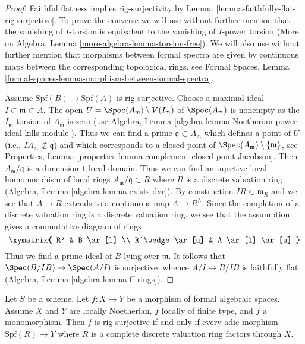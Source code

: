 \begin{proof}
Faithful flatness implies rig-surjectivity by
Lemma \ref{lemma-faithfully-flat-rig-surjective}.
To prove the converse we will use without further mention that the
vanishing of $I$-torsion is equivalent to the vanishing of $I$-power torsion
(More on Algebra, Lemma \ref{more-algebra-lemma-torsion-free}).
We will also use without further mention that morphisms between
formal spectra are given by continuous maps between the corresponding
topological rings, see
Formal Spaces, Lemma \ref{formal-spaces-lemma-morphism-between-formal-spectra}.

\medskip\noindent
Assume $\text{Spf}(B) \to \text{Spf}(A)$ is rig-surjective.
Choose a maximal ideal $I \subset \mathfrak m \subset A$.
The open $U = \Spec(A_\mathfrak m) \setminus V(I_\mathfrak m)$
of $\Spec(A_\mathfrak m)$ is nonempty as the $I_\mathfrak m$-torsion of
$A_\mathfrak m$ is zero
(use Algebra, Lemma \ref{algebra-lemma-Noetherian-power-ideal-kills-module}).
Thus we can find a prime $\mathfrak q \subset A_\mathfrak m$ which defines
a point of $U$ (i.e., $IA_\mathfrak m \not \subset \mathfrak q$)
and which corresponds to a closed point
of $\Spec(A_\mathfrak m) \setminus \{\mathfrak m\}$, see
Properties, Lemma \ref{properties-lemma-complement-closed-point-Jacobson}.
Then $A_\mathfrak m/\mathfrak q$ is a dimension $1$ local domain.
Thus we can find an injective local homomorphism of local rings
$A_\mathfrak m/\mathfrak q \subset R$ where $R$ is a discrete valuation ring
(Algebra, Lemma \ref{algebra-lemma-exists-dvr}).
By construction $IR \subset \mathfrak m_R$ and we see that
$A \to R$ extends to a continuous map $A \to R^\wedge$.
Since the completion of a discrete valuation ring is a discrete
valuation ring, we see that the assumption gives a commutative
diagram of rings
$$
\xymatrix{
R' & B \ar[l] \\
R^\wedge \ar[u] & A \ar[l] \ar[u]
}
$$
Thus we find a prime ideal of $B$ lying over $\mathfrak m$. It follows
that $\Spec(B/IB) \to \Spec(A/I)$ is surjective, whence $A/I \to B/IB$
is faithfully flat
(Algebra, Lemma \ref{algebra-lemma-ff-rings}).
\end{proof}

\begin{lemma}
\label{lemma-monomorphism-rig-surjective}
Let $S$ be a scheme. Let $f : X \to Y$ be a morphism of formal algebraic
spaces. Assume $X$ and $Y$ are locally Noetherian, $f$ locally of finite
type, and $f$ a monomorphism. Then $f$ is rig surjective if and only if
every adic morphism $\text{Spf}(R) \to Y$ where $R$ is a complete discrete
valuation ring factors through $X$.
\end{lemma}

